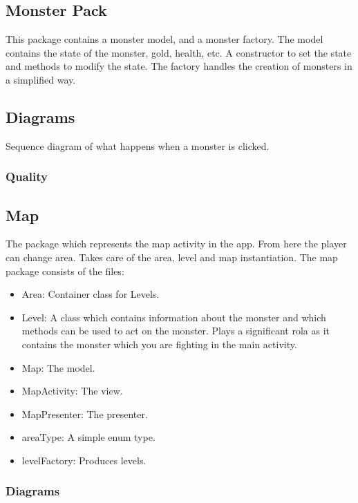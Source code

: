 \documentclass{article}
\begin{document}
\subsection{Monster Pack}
This package contains a monster model, and a monster factory. The model contains the state of the monster, gold, health, etc. A constructor to set the state and methods
to modify the state. The factory handles the creation of monsters in a simplified way.

\subsection{Diagrams}
\begin{center}
    Sequence diagram of what happens when a monster is clicked.\\
\end{center}

\subsubsection{Quality}

\subsection{Map}
The package which represents the map activity in the app. From here the player can change area. Takes care of the area, level and map instantiation.
The map package consists of the files:
\begin{itemize}
    \item Area: Container class for Levels.
    \item Level: A class which contains information about the monster and which methods can be used to act on the monster. Plays a significant rola as it contains the monster which you are fighting in the main activity.
    \item Map: The model.
    \item MapActivity: The view.
    \item MapPresenter: The presenter.
    \item areaType: A simple enum type.
    \item levelFactory: Produces levels.
\end{itemize}

\subsubsection{Diagrams}
\end{document}
